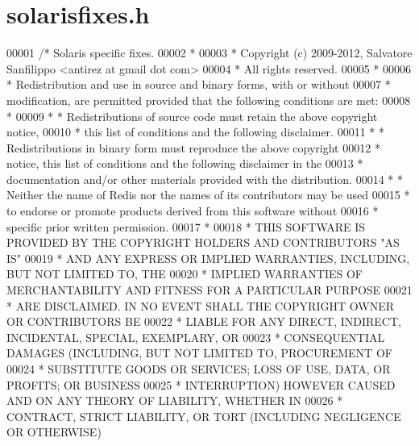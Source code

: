 \hypertarget{solarisfixes_8h_source}{}\section{solarisfixes.\+h}
\label{solarisfixes_8h_source}

\begin{DoxyCode}
00001 \textcolor{comment}{/* Solaris specific fixes.}
00002 \textcolor{comment}{ *}
00003 \textcolor{comment}{ * Copyright (c) 2009-2012, Salvatore Sanfilippo <antirez at gmail dot com>}
00004 \textcolor{comment}{ * All rights reserved.}
00005 \textcolor{comment}{ *}
00006 \textcolor{comment}{ * Redistribution and use in source and binary forms, with or without}
00007 \textcolor{comment}{ * modification, are permitted provided that the following conditions are met:}
00008 \textcolor{comment}{ *}
00009 \textcolor{comment}{ *   * Redistributions of source code must retain the above copyright notice,}
00010 \textcolor{comment}{ *     this list of conditions and the following disclaimer.}
00011 \textcolor{comment}{ *   * Redistributions in binary form must reproduce the above copyright}
00012 \textcolor{comment}{ *     notice, this list of conditions and the following disclaimer in the}
00013 \textcolor{comment}{ *     documentation and/or other materials provided with the distribution.}
00014 \textcolor{comment}{ *   * Neither the name of Redis nor the names of its contributors may be used}
00015 \textcolor{comment}{ *     to endorse or promote products derived from this software without}
00016 \textcolor{comment}{ *     specific prior written permission.}
00017 \textcolor{comment}{ *}
00018 \textcolor{comment}{ * THIS SOFTWARE IS PROVIDED BY THE COPYRIGHT HOLDERS AND CONTRIBUTORS "AS IS"}
00019 \textcolor{comment}{ * AND ANY EXPRESS OR IMPLIED WARRANTIES, INCLUDING, BUT NOT LIMITED TO, THE}
00020 \textcolor{comment}{ * IMPLIED WARRANTIES OF MERCHANTABILITY AND FITNESS FOR A PARTICULAR PURPOSE}
00021 \textcolor{comment}{ * ARE DISCLAIMED. IN NO EVENT SHALL THE COPYRIGHT OWNER OR CONTRIBUTORS BE}
00022 \textcolor{comment}{ * LIABLE FOR ANY DIRECT, INDIRECT, INCIDENTAL, SPECIAL, EXEMPLARY, OR}
00023 \textcolor{comment}{ * CONSEQUENTIAL DAMAGES (INCLUDING, BUT NOT LIMITED TO, PROCUREMENT OF}
00024 \textcolor{comment}{ * SUBSTITUTE GOODS OR SERVICES; LOSS OF USE, DATA, OR PROFITS; OR BUSINESS}
00025 \textcolor{comment}{ * INTERRUPTION) HOWEVER CAUSED AND ON ANY THEORY OF LIABILITY, WHETHER IN}
00026 \textcolor{comment}{ * CONTRACT, STRICT LIABILITY, OR TORT (INCLUDING NEGLIGENCE OR OTHERWISE)}

\end{DoxyCode}
